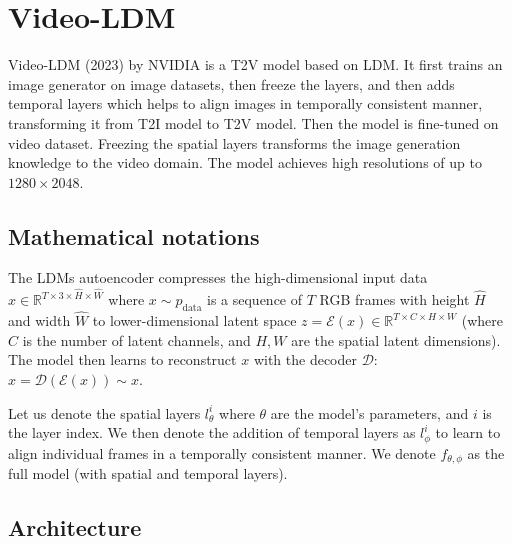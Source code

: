 \section{Video-LDM}
\label{sec:videoldm}

Video-LDM (2023) by NVIDIA \cite{video_ldm} is a T2V model based on LDM. It first trains an image generator on image datasets, then freeze the layers, and then adds temporal layers which helps to align images in temporally consistent manner, transforming it from T2I model to T2V model. Then the model is fine-tuned on video dataset. Freezing the spatial layers transforms the image generation knowledge to the video domain. The model achieves high resolutions of up to $1280\times 2048$.


\subsection*{Mathematical notations}

The LDMs autoencoder compresses the high-dimensional input data $x \in \mathbb{R}^{T \times 3 \times \hat{H} \times \hat{W}}$ where $x \sim p_{\text{data}}$ is a sequence of $T$ RGB frames with height $\hat{H}$ and width $\hat{W}$ to lower-dimensional latent space $z = \mathcal{E} (x) \in \mathbb{R}^{T \times C \times H \times W}$ (where $C$ is the number of latent channels, and $H, W$ are the spatial latent dimensions). The model then learns to reconstruct $x$ with the decoder $\mathcal{D}$: $\hat{x} = \mathcal{D} (\mathcal{E} (x)) \sim x$.

Let us denote the spatial layers $l^i_{\theta}$ where $\theta$ are the model's parameters, and $i$ is the layer index. We then denote the addition of temporal layers as $l^i_{\phi}$ to learn to align individual frames in a temporally consistent manner. We denote $f_{\theta, \phi}$ as the full model (with spatial and temporal layers).








\subsection{Architecture}

